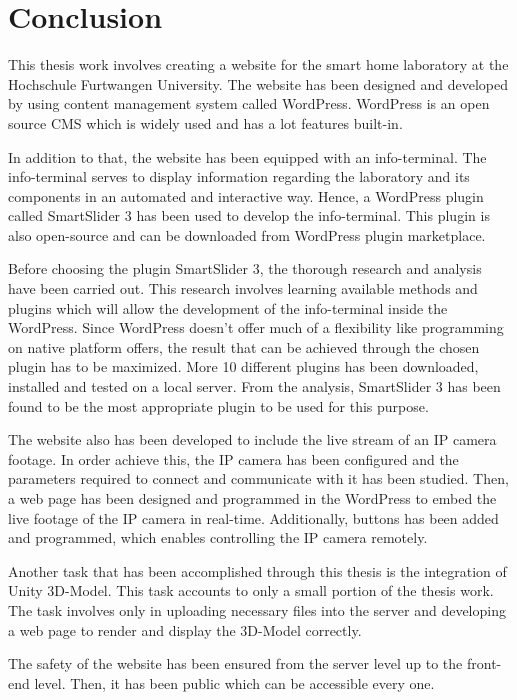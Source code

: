 \chapter{Conclusion}
This thesis work involves creating a website for the smart home laboratory at the Hochschule Furtwangen University. The website has been designed and developed by using content management system called WordPress. WordPress is an open source CMS which is widely used and has a lot features built-in.

In addition to that, the website has been equipped with an info-terminal. The info-terminal serves to display information regarding the laboratory and its components in an automated and interactive way. Hence, a WordPress plugin called SmartSlider 3 has been used to develop the info-terminal. This plugin is also open-source and can be downloaded from WordPress plugin marketplace.

Before choosing the plugin SmartSlider 3, the thorough research and analysis have been carried out. This research involves learning available methods and plugins which will allow the development of the info-terminal inside the WordPress. Since WordPress doesn't offer much of a flexibility like programming on native platform offers, the result that can be achieved through the chosen plugin has to be maximized. More 10 different plugins has been downloaded, installed and tested on a local server. From the analysis, SmartSlider 3 has been found to be the most appropriate plugin to be used for this purpose.

The website also has been developed to include the live stream of an IP camera footage. In order achieve this, the IP camera has been configured and the parameters required to connect and communicate with it has been studied. Then, a web page has been designed and programmed in the WordPress to embed the live footage of the IP camera in real-time. Additionally, buttons has been added and programmed, which enables controlling the IP camera remotely.

Another task that has been accomplished through this thesis is the integration of Unity 3D-Model. This task accounts to only a small portion of the thesis work. The task involves only in uploading necessary files into the server and developing a web page to render and display the 3D-Model correctly.

The safety of the website has been ensured from the server level up to the front-end level. Then, it has been public which can be accessible every one.

